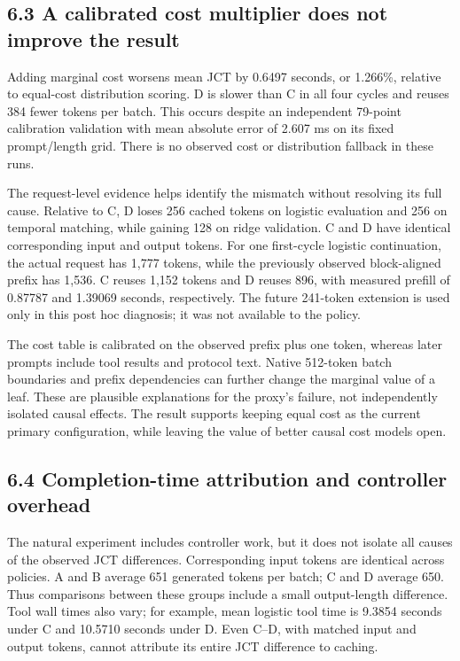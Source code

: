 \documentclass[
  english,
  10pt,
]{article}
\begin{document}
\subsection{6.3 A calibrated cost multiplier does not improve the
result}\label{a-calibrated-cost-multiplier-does-not-improve-the-result}

Adding marginal cost worsens mean JCT by 0.6497 seconds, or 1.266\%,
relative to equal-cost distribution scoring. D is slower than C in all
four cycles and reuses 384 fewer tokens per batch. This occurs despite
an independent 79-point calibration validation with mean absolute error
of 2.607 ms on its fixed prompt/length grid. There is no observed cost
or distribution fallback in these runs.

The request-level evidence helps identify the mismatch without resolving
its full cause. Relative to C, D loses 256 cached tokens on logistic
evaluation and 256 on temporal matching, while gaining 128 on ridge
validation. C and D have identical corresponding input and output
tokens. For one first-cycle logistic continuation, the actual request
has 1,777 tokens, while the previously observed block-aligned prefix has
1,536. C reuses 1,152 tokens and D reuses 896, with measured prefill of
0.87787 and 1.39069 seconds, respectively. The future 241-token
extension is used only in this post hoc diagnosis; it was not available
to the policy.

The cost table is calibrated on the observed prefix plus one token,
whereas later prompts include tool results and protocol text. Native
512-token batch boundaries and prefix dependencies can further change
the marginal value of a leaf. These are plausible explanations for the
proxy's failure, not independently isolated causal effects. The result
supports keeping equal cost as the current primary configuration, while
leaving the value of better causal cost models open.

\subsection{6.4 Completion-time attribution and controller
overhead}\label{completion-time-attribution-and-controller-overhead}

The natural experiment includes controller work, but it does not isolate
all causes of the observed JCT differences. Corresponding input tokens
are identical across policies. A and B average 651 generated tokens per
batch; C and D average 650. Thus comparisons between these groups
include a small output-length difference. Tool wall times also vary; for
example, mean logistic tool time is 9.3854 seconds under C and 10.5710
seconds under D. Even C--D, with matched input and output tokens, cannot
attribute its entire JCT difference to caching.
\end{document}
